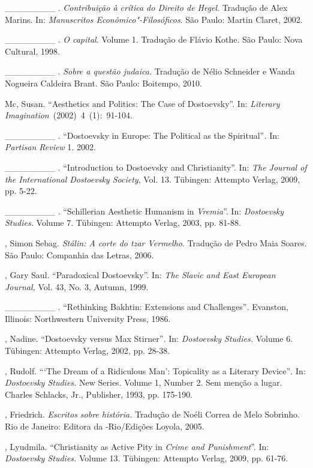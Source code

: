 \begin{Parskip}
\_\_\_\_\_\_\_\_ . \emph{Contribuição à crítica do Direito de Hegel}.
Tradução de Alex Marins. In: \emph{Manuscritos Econômico"-Filosóficos}.
São Paulo: Martin Claret, 2002.

\_\_\_\_\_\_\_\_ . \emph{O capital}. Volume 1. Tradução de Flávio Kothe.
São Paulo: Nova Cultural, 1998.

\_\_\_\_\_\_\_\_ . \emph{Sobre a questão judaica.} Tradução de Nélio
Schneider e Wanda Nogueira Caldeira Brant. São Paulo: Boitempo, 2010.

Mc, Susan. ``Aesthetics and Politics: The Case of Dostoevsky''.
In: \emph{Literary Imagination}~(2002)~4~(1):~91-104.

\_\_\_\_\_\_\_\_ . ``Dostoevsky in Europe: The Political as the
Spiritual''\emph{.} In: \emph{Partisan Review} 1. 2002.

\_\_\_\_\_\_\_\_ . ``Introduction to Dostoevsky and Christianity''. In:
\emph{The Journal of the International Dostoevsky Society}, Vol. 13.
Tübingen: Attempto Verlag, 2009, pp. 5-22.

\_\_\_\_\_\_\_\_ . ``Schillerian Aesthetic Humanism in \emph{Vremia}''.
In: \emph{Dostoevsky Studies.} Volume 7. Tübingen: Attempto Verlag,
2003, pp. 81-88.

, Simon Sebag. \emph{Stálin: A corte do tzar Vermelho}.
Tradução de Pedro Maia Soares. São Paulo: Companhia das Letras, 2006.

, Gary Saul. ``Paradoxical Dostoevsky''. In: \emph{The Slavic and
East European Journal,} Vol. 43, No. 3, Autumn, 1999.

\_\_\_\_\_\_\_\_ . ``Rethinking Bakhtin: Extensions and
Challenges''\emph{.} Evanston, Illinois: Northwestern University Press,
1986.

, Nadine. ``Dostoevsky versus Max Stirner''\emph{.} In:
\emph{Dostoevsky Studies.} Volume 6. Tübingen: Attempto Verlag, 2002,
pp. 28-38.

, Rudolf. ```The Dream of a Ridiculous Man': Topicality as a
Literary Device''\emph{.} In: \emph{Dostoevsky Studies.} New Series.
Volume 1, Number 2. Sem menção a lugar. Charles Schlacks, Jr.,
Publisher, 1993, pp. 175-190.

, Friedrich. \emph{Escritos sobre história.} Tradução de Noéli
Correa de Melo Sobrinho. Rio de Janeiro: Editora da -Rio/Edições
Loyola, 2005.

, Lyudmila. ``Christianity as Active Pity in \emph{Crime and
Punishment}''. In: \emph{Dostoevsky Studies.} Volume 13. Tübingen:
Attempto Verlag, 2009, pp. 61-76.


\end{Parskip}
